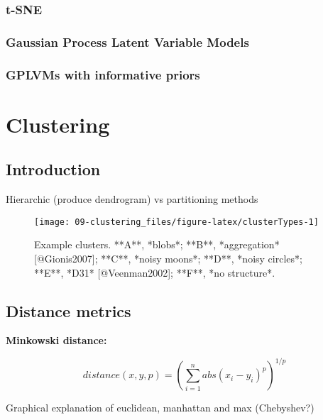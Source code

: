 \documentclass[]{book}
\theoremstyle{definition}
\theoremstyle{definition}
\theoremstyle{definition}
\theoremstyle{remark}
\begin{document}
\subsection{t-SNE}\label{t-sne}

\subsection{Gaussian Process Latent Variable
Models}\label{gaussian-process-latent-variable-models}

\subsection{GPLVMs with informative
priors}\label{gplvms-with-informative-priors}

\chapter{Clustering}\label{clustering}

\section{Introduction}\label{introduction}

Hierarchic (produce dendrogram) vs partitioning methods

\begin{figure}

{\centering \texttt{[image: 09-clustering\_files/figure-latex/clusterTypes-1]} 

}

\caption{Example clusters. **A**, *blobs*; **B**, *aggregation* [@Gionis2007]; **C**, *noisy moons*; **D**, *noisy circles*; **E**, *D31* [@Veenman2002]; **F**, *no structure*.}\label{fig:clusterTypes}
\end{figure}

\section{Distance metrics}\label{distance-metrics}

\textbf{Minkowski distance:}

\begin{equation}
  distance\left(x,y,p\right)=\left(\sum_{i=1}^{n} abs(x_i-y_i)^p\right)^{1/p}
  \label{eq:minkowski}
\end{equation}

Graphical explanation of euclidean, manhattan and max (Chebyshev?)
\end{document}
